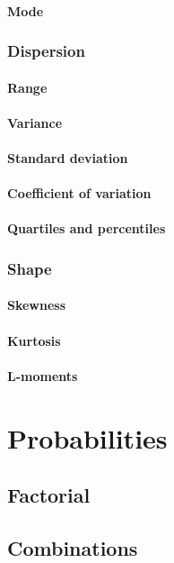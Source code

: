\documentclass{report}
\begin{document}
	\subsubsection{Mode}
	\subsection{Dispersion}
	\subsubsection{Range}
	\subsubsection{Variance}
	\subsubsection{Standard deviation}
	\subsubsection{Coefficient of variation}
	\subsubsection{Quartiles and percentiles}
	\subsection{Shape}
	\subsubsection{Skewness}
	\subsubsection{Kurtosis}
	\subsubsection{L-moments}

\chapter{Probabilities}
	\section{Factorial}
	\section{Combinations}
\end{document}
